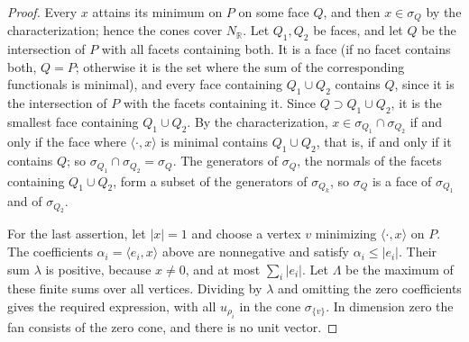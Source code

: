 \begin{proof}
Every $x$ attains its minimum on $P$ on some face $Q$, and then $x\in\sigma_Q$ by the characterization; hence the cones cover $N_{\mathbb R}$. Let $Q_1,Q_2$ be faces, and let $Q$ be the intersection of $P$ with all facets containing both. It is a face (if no facet contains both, $Q=P$; otherwise it is the set where the sum of the corresponding functionals is minimal), and every face containing $Q_1\cup Q_2$ contains $Q$, since it is the intersection of $P$ with the facets containing it. Since $Q\supset Q_1\cup Q_2$, it is the smallest face containing $Q_1\cup Q_2$. By the characterization, $x\in\sigma_{Q_1}\cap\sigma_{Q_2}$ if and only if the face where $\langle\cdot,x\rangle$ is minimal contains $Q_1\cup Q_2$, that is, if and only if it contains $Q$; so $\sigma_{Q_1}\cap\sigma_{Q_2}=\sigma_Q$. The generators of $\sigma_Q$, the normals of the facets containing $Q_1\cup Q_2$, form a subset of the generators of $\sigma_{Q_k}$, so $\sigma_Q$ is a face of $\sigma_{Q_1}$ and of $\sigma_{Q_2}$.

For the last assertion, let $|x|=1$ and choose a vertex $v$ minimizing $\langle\cdot,x\rangle$ on $P$. The coefficients $\alpha_i=\langle e_i,x\rangle$ above are nonnegative and satisfy $\alpha_i\leq|e_i|$. Their sum $\lambda$ is positive, because $x\neq0$, and at most $\sum_i|e_i|$. Let $\Lambda$ be the maximum of these finite sums over all vertices. Dividing by $\lambda$ and omitting the zero coefficients gives the required expression, with all $u_{\rho_i}$ in the cone $\sigma_{\{v\}}$. In dimension zero the fan consists of the zero cone, and there is no unit vector.
\end{proof}

